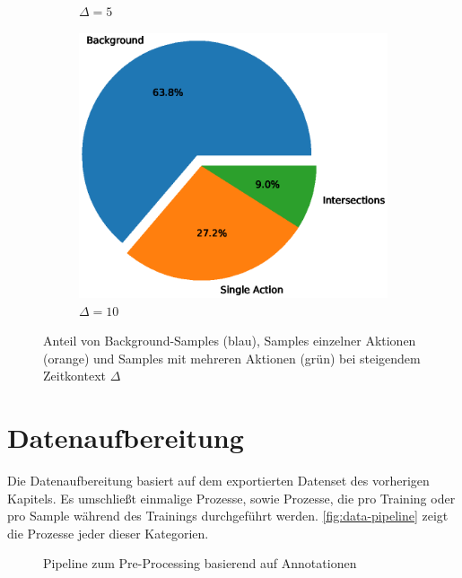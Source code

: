 \begin{figure}
\begin{subfigure}{.24\textwidth}
        \caption{$\Delta = 5$}
    \end{subfigure}
    \begin{subfigure}{.24\textwidth}
        \centering
        \includegraphics[width=.95\linewidth]{img/05_background_ratio_all_delta_10.eps}
        \caption{$\Delta = 10$}
    \end{subfigure}
    \caption{Anteil von Background-Samples (blau), Samples einzelner Aktionen (orange) und Samples mit mehreren Aktionen (grün) bei steigendem Zeitkontext $\Delta$}
    \label{fig:ratios}
\end{figure}

\section{Datenaufbereitung}
\label{sec:pre-processing}

Die Datenaufbereitung basiert auf dem exportierten Datenset des vorherigen Kapitels.
Es umschließt einmalige Prozesse, sowie Prozesse, die pro Training oder pro Sample während des Trainings durchgeführt werden.
\autoref{fig:data-pipeline} zeigt die Prozesse jeder dieser Kategorien.

\begin{figure}
    \centering
    \caption{Pipeline zum Pre-Processing basierend auf Annotationen}
    \label{fig:data-pipeline}
\end{figure}

